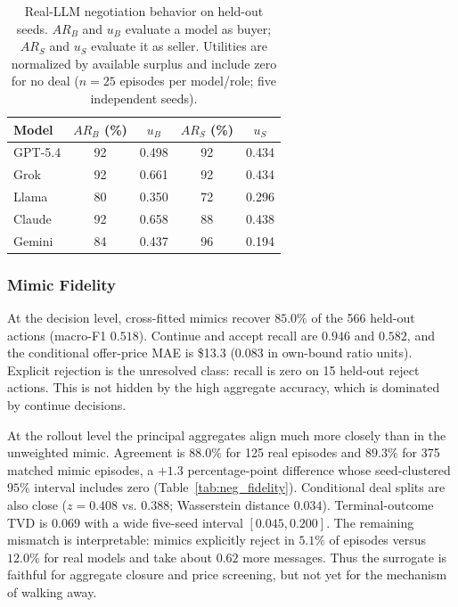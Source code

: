 \begin{table}[htbp]
\caption{Real-LLM negotiation behavior on held-out seeds. $AR_B$ and $u_B$ evaluate a model as buyer; $AR_S$ and $u_S$ evaluate it as seller. Utilities are normalized by available surplus and include zero for no deal ($n=25$ episodes per model/role; five independent seeds).}
\label{tab:neg_behavior}
\centering
\begin{tabular}{lcccc}
\hline
Model & $AR_B$ (\%) & $u_B$ & $AR_S$ (\%) & $u_S$ \\
\hline
GPT-5.4 & 92 & 0.498 & 92 & 0.434 \\
Grok    & 92 & 0.661 & 92 & 0.434 \\
Llama   & 80 & 0.350 & 72 & 0.296 \\
Claude  & 92 & 0.658 & 88 & 0.438 \\
Gemini  & 84 & 0.437 & 96 & 0.194 \\
\hline
\end{tabular}
\end{table}

\subsubsection{Mimic Fidelity}
\label{sec:neg-fidelity}

At the decision level, cross-fitted mimics recover $85.0\%$ of the 566 held-out actions (macro-F1 $0.518$). Continue and accept recall are $0.946$ and $0.582$, and the conditional offer-price MAE is \$13.3 (0.083 in own-bound ratio units). Explicit rejection is the unresolved class: recall is zero on 15 held-out reject actions. This is not hidden by the high aggregate accuracy, which is dominated by continue decisions.

At the rollout level the principal aggregates align much more closely than in the unweighted mimic. Agreement is $88.0\%$ for 125 real episodes and $89.3\%$ for 375 matched mimic episodes, a $+1.3$ percentage-point difference whose seed-clustered $95\%$ interval includes zero (Table~\ref{tab:neg_fidelity}). Conditional deal splits are also close ($z=0.408$ vs. $0.388$; Wasserstein distance $0.034$). Terminal-outcome TVD is $0.069$ with a wide five-seed interval $[0.045,0.200]$. The remaining mismatch is interpretable: mimics explicitly reject in $5.1\%$ of episodes versus $12.0\%$ for real models and take about $0.62$ more messages. Thus the surrogate is faithful for aggregate closure and price screening, but not yet for the mechanism of walking away.


